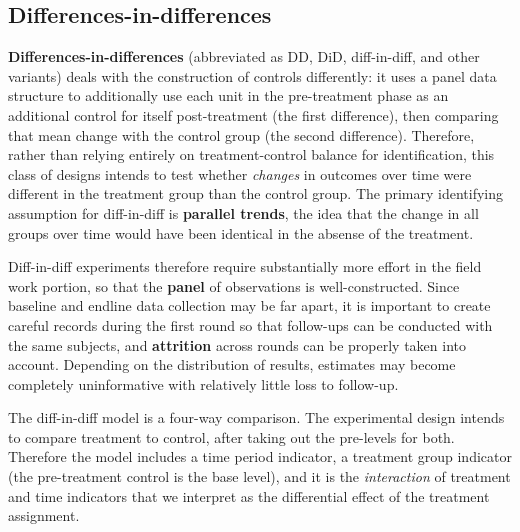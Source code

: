 \subsection{Differences-in-differences}

\textbf{Differences-in-differences}
(abbreviated as DD, DiD, diff-in-diff, and other variants)
deals with the construction of controls differently:
it uses a panel data structure to additionally use each
unit in the pre-treatment phase as an additional control for itself post-treatment (the first difference),
then comparing that mean change with the control group (the second difference).\cite{mckenzie2012beyond}
Therefore, rather than relying entirely on treatment-control balance for identification,
this class of designs intends to test whether \textit{changes}
in outcomes over time were different in the treatment group than the control group.
The primary identifying assumption for diff-in-diff is \textbf{parallel trends},
the idea that the change in all groups over time would have been identical
in the absense of the treatment.

Diff-in-diff experiments therefore require substantially more effort
in the field work portion, so that the \textbf{panel} of observations is well-constructed.
Since baseline and endline data collection may be far apart,
it is important to create careful records during the first round
so that follow-ups can be conducted with the same subjects,
and \textbf{attrition} across rounds can be properly taken into account.
Depending on the distribution of results,
estimates may become completely uninformative
with relatively little loss to follow-up.

The diff-in-diff model is a four-way comparison.
The experimental design intends to compare treatment to control,
after taking out the pre-levels for both.
Therefore the model includes a time period indicator,
a treatment group indicator (the pre-treatment control is the base level),
and it is the \textit{interaction} of treatment and time indicators
that we interpret as the differential effect of the treatment assignment.


